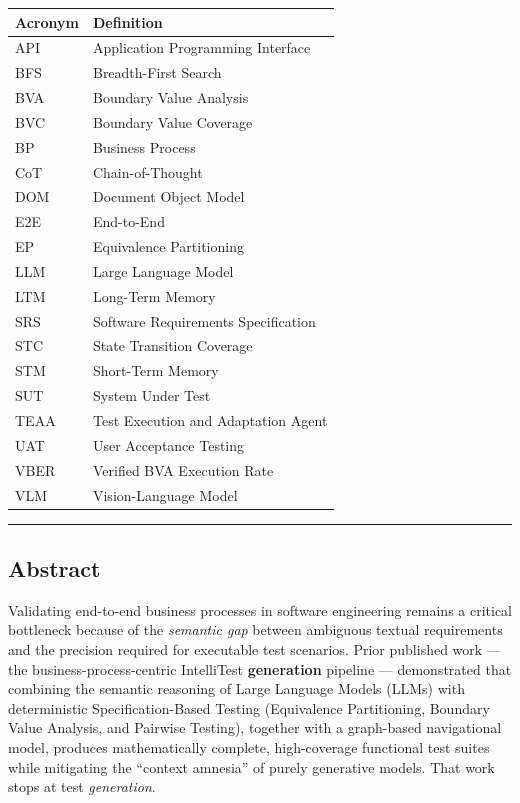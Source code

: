\documentclass[
]{article}
\newcounter{none} %
\begin{document}
{\def\LTcaptype{none} %
\begin{longtable}[]{@{}ll@{}}
\toprule\noalign{}
Acronym & Definition \\
\midrule\noalign{}
\endhead
\bottomrule\noalign{}
\endlastfoot
API & Application Programming Interface \\
BFS & Breadth-First Search \\
BVA & Boundary Value Analysis \\
BVC & Boundary Value Coverage \\
BP & Business Process \\
CoT & Chain-of-Thought \\
DOM & Document Object Model \\
E2E & End-to-End \\
EP & Equivalence Partitioning \\
LLM & Large Language Model \\
LTM & Long-Term Memory \\
SRS & Software Requirements Specification \\
STC & State Transition Coverage \\
STM & Short-Term Memory \\
SUT & System Under Test \\
TEAA & Test Execution and Adaptation Agent \\
UAT & User Acceptance Testing \\
VBER & Verified BVA Execution Rate \\
VLM & Vision-Language Model \\
\end{longtable}
}

\begin{center}\rule{0.5\linewidth}{0.5pt}\end{center}

\subsection{Abstract}\label{abstract}

Validating end-to-end business processes in software engineering remains
a critical bottleneck because of the \emph{semantic gap} between
ambiguous textual requirements and the precision required for executable
test scenarios. Prior published work --- the business-process-centric
IntelliTest \textbf{generation} pipeline --- demonstrated that combining
the semantic reasoning of Large Language Models (LLMs) with
deterministic Specification-Based Testing (Equivalence Partitioning,
Boundary Value Analysis, and Pairwise Testing), together with a
graph-based navigational model, produces mathematically complete,
high-coverage functional test suites while mitigating the ``context
amnesia'' of purely generative models. That work stops at test
\emph{generation}.
\end{document}
